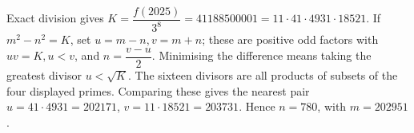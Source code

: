 Exact division gives $K = \dfrac{f (2025)}{3^8} = 41188500001 = 11 \cdot 41 \cdot 4931 \cdot 18521$. If $m^2-n^2=K$, set $u=m-n,v=m+n$; these are positive odd factors with $uv=K,u<v$, and $n = \dfrac{v-u}{2}$. Minimising the difference means taking the greatest divisor $u<\sqrt K$. The sixteen divisors are all products of subsets of the four displayed primes. Comparing these gives the nearest pair $u=41\cdot4931=202171$, $v=11\cdot18521=203731$. Hence $\boxed{n=780}$, with $m=202951$.

